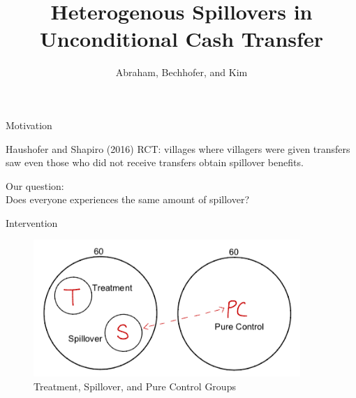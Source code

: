 \documentclass[14pt, aspectratio=169]{beamer}
\title[Heteregenous Spillovers in Unconditional Cash Transfer] %
{Heterogenous Spillovers in Unconditional Cash Transfer}
\author[Abraham, Bechhofer, and Kim] %
{Abraham, Bechhofer, and Kim }
\newenvironment{wideitemize}{\itemize\addtolength{\itemsep}{10pt}}{\enditemize}
\let\OLDitemize\itemize
\renewcommand\itemize{\OLDitemize\addtolength{\itemsep}{10pt}}
\begin{document}
\begin{frame}
  \titlepage
\end{frame}

\begin{frame}{Motivation}
\begin{wideitemize}
	\item Haushofer and Shapiro (2016) RCT: villages where villagers were given transfers saw even those who did not receive transfers obtain spillover benefits.
	\item Our question: \\ Does everyone experiences the same amount of spillover? 
\end{wideitemize}
\end{frame}


\begin{frame}{Intervention}
\begin{figure}[H]
	\centering
	\includegraphics[width=0.9\textwidth]{design.png}
	\caption{Treatment, Spillover, and Pure Control Groups}
\end{figure}
\end{frame}
\end{document}

